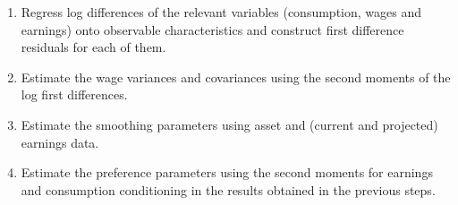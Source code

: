 \documentclass[notes=show]{beamer}
\begin{document}
\begin{frame}%



\begin{enumerate}
\item Regress log differences of the relevant variables (consumption, wages
and earnings) onto observable characteristics and construct first difference
residuals for each of them.

\item Estimate the wage variances and covariances using the second moments
of the log first differences.

\item Estimate the smoothing parameters using asset and (current and
projected) earnings data.

\item Estimate the preference parameters using the second moments for
earnings and consumption conditioning in the results obtained in the
previous steps.
\end{enumerate}

\transboxout%
\end{frame}%

\bigskip

\begin{frame}%



\begin{center}
\textbf{}
\end{center}

\transboxout%
\end{frame}%
\end{document}
